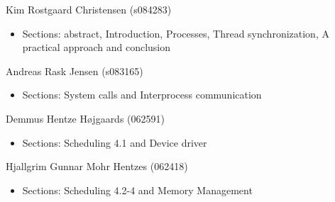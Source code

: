 Kim Rostgaard Christensen (s084283) 
\begin{itemize}
\item Sections: abstract, Introduction, Processes, Thread synchronization, A practical approach and conclusion
\end{itemize}

Andreas Rask Jensen (s083165)
\begin{itemize}
\item Sections: System calls and Interprocess communication
\end{itemize}


Demmus Hentze Højgaards (062591)
\begin{itemize}
\item Sections: Scheduling 4.1 and Device driver
\end{itemize}

Hjallgrim Gunnar Mohr Hentzes (062418)
\begin{itemize}
\item Sections: Scheduling 4.2-4 and Memory Management
\end{itemize}



